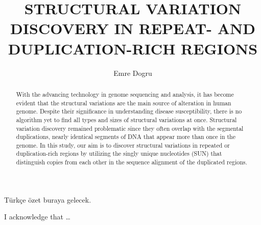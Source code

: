 \documentclass{buthesis}
\title{STRUCTURAL VARIATION DISCOVERY IN REPEAT- AND DUPLICATION-RICH REGIONS}
\author{Emre Dogru}
\begin{document}
\titlepageMS %
\signaturepageMS %

\thispagestyle{plain}
\begin{abstract}
With the advancing technology in genome sequencing and analysis, it has become evident that the structural variations are the main source of alteration in human genome. Despite their significance in understanding disease susceptibility, there is no algorithm yet to find all types and sizes of structural variations at once. Structural variation discovery remained problematic since they often overlap with the segmental duplications, nearly identical segments of DNA that appear more than once in the genome. In this study, our aim is to discover structural variations in repeated or duplication-rich regions by utilizing the singly unique nucleotides (SUN) that distinguish copies from each other in the sequence alignment of the duplicated regions.
\end{abstract}

\begin{ozet}
 T\"urk\c ce \"ozet buraya gelecek. 
\end{ozet}

\begin{ack}
 I acknowledge that \ldots
\end{ack}

\tableofcontents
\listoffigures
\listoftables
\listofalgorithms
\newpage
\newpage
%
\newpage 
\pagestyle{headings}
\makeatother
\end{document}
